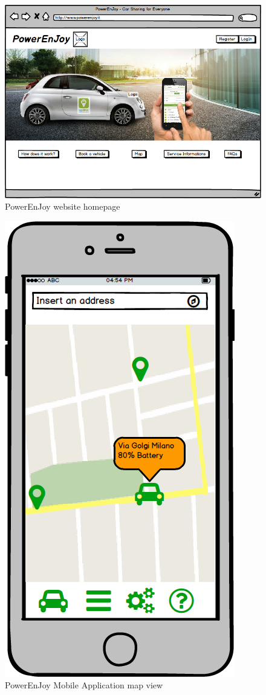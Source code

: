 \begin{figure}[h]
	\centering
\includegraphics[scale=0.4]{img/webhome}
	\caption{PowerEnJoy website homepage}
\end{figure}
\FloatBarrier

\begin{figure}[h]
	\centering
	\includegraphics[scale=0.4]{img/appmap}
	\caption{PowerEnJoy Mobile Application map view}
\end{figure}
\FloatBarrier




